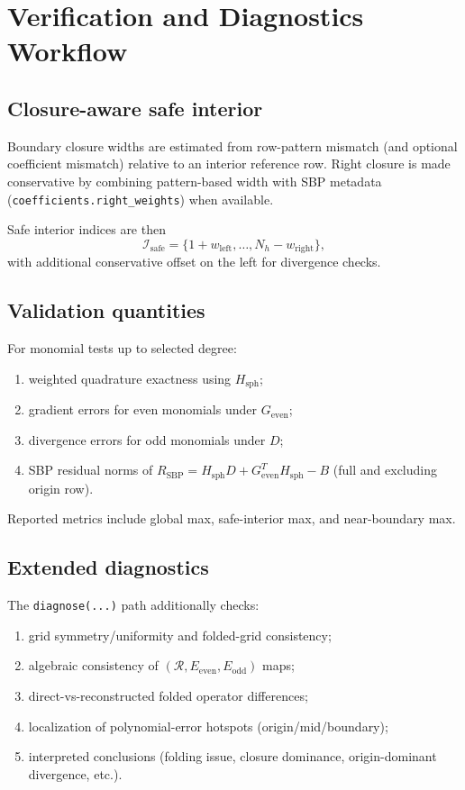 \documentclass[
  aps,
  pre,
  reprint,
  superscriptaddress,
  nofootinbib
]{revtex4-2}
\newcommand{\Rmat}{\mathcal{R}}
\newcommand{\Ee}{E_{\mathrm{even}}}
\newcommand{\Eo}{E_{\mathrm{odd}}}
\newcommand{\Ge}{G_{\mathrm{even}}}
\newcommand{\Hs}{H_{\mathrm{sph}}}
\newcommand{\Rsbp}{R_{\mathrm{SBP}}}
\begin{document}
\section{Verification and Diagnostics Workflow}
\subsection{Closure-aware safe interior}
Boundary closure widths are estimated from row-pattern mismatch (and optional
coefficient mismatch) relative to an interior reference row. Right closure is made
conservative by combining pattern-based width with SBP metadata
(\texttt{coefficients.right\_weights}) when available.

Safe interior indices are then
\begin{equation}
\mathcal{I}_{\mathrm{safe}}=\{1+w_{\mathrm{left}},\ldots,N_h-w_{\mathrm{right}}\},
\end{equation}
with additional conservative offset on the left for divergence checks.

\subsection{Validation quantities}
For monomial tests up to selected degree:
\begin{enumerate}
  \item weighted quadrature exactness using $\Hs$;
  \item gradient errors for even monomials under $\Ge$;
  \item divergence errors for odd monomials under $D$;
  \item SBP residual norms of
  $\Rsbp=\Hs D+\Ge^T\Hs-B$
  (full and excluding origin row).
\end{enumerate}
Reported metrics include global max, safe-interior max, and near-boundary max.

\subsection{Extended diagnostics}
The \texttt{diagnose(...)} path additionally checks:
\begin{enumerate}
  \item grid symmetry/uniformity and folded-grid consistency;
  \item algebraic consistency of $(\Rmat,\Ee,\Eo)$ maps;
  \item direct-vs-reconstructed folded operator differences;
  \item localization of polynomial-error hotspots (origin/mid/boundary);
  \item interpreted conclusions (folding issue, closure dominance, origin-dominant divergence, etc.).
\end{enumerate}
\end{document}
